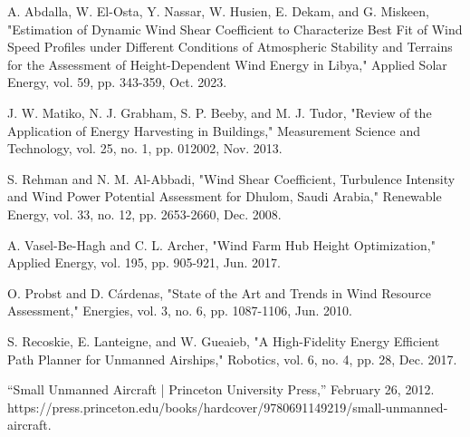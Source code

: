 \documentclass[conference]{IEEEtran}
\begin{document}
\begin{thebibliography}{00}

 A. Abdalla, W. El-Osta, Y. Nassar, W. Husien, E. Dekam, and G. Miskeen, "Estimation of Dynamic Wind Shear Coefficient to Characterize Best Fit of Wind Speed Profiles under Different Conditions of Atmospheric Stability and Terrains for the Assessment of Height-Dependent Wind Energy in Libya," Applied Solar Energy, vol. 59, pp. 343-359, Oct. 2023.

 J. W. Matiko, N. J. Grabham, S. P. Beeby, and M. J. Tudor, "Review of the Application of Energy Harvesting in Buildings," Measurement Science and Technology, vol. 25, no. 1, pp. 012002, Nov. 2013.

 S. Rehman and N. M. Al-Abbadi, "Wind Shear Coefficient, Turbulence Intensity and Wind Power Potential Assessment for Dhulom, Saudi Arabia," Renewable Energy, vol. 33, no. 12, pp. 2653-2660, Dec. 2008.

 A. Vasel-Be-Hagh and C. L. Archer, "Wind Farm Hub Height Optimization," Applied Energy, vol. 195, pp. 905-921, Jun. 2017.

 O. Probst and D. Cárdenas, "State of the Art and Trends in Wind Resource Assessment," Energies, vol. 3, no. 6, pp. 1087-1106, Jun. 2010.

 S. Recoskie, E. Lanteigne, and W. Gueaieb, "A High-Fidelity Energy Efficient Path Planner for Unmanned Airships," Robotics, vol. 6, no. 4, pp. 28, Dec. 2017.

“Small Unmanned Aircraft | Princeton University Press,” February 26, 2012. https://press.princeton.edu/books/hardcover/9780691149219/small-unmanned-aircraft.


\end{thebibliography}
\end{document}
